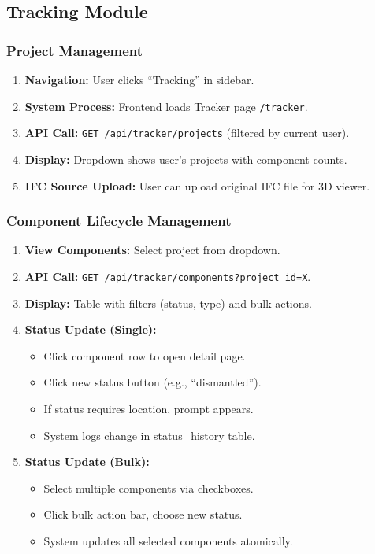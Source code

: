 \documentclass[11pt,a4paper]{article}
\begin{document}
\subsection{Tracking Module}

\subsubsection{Project Management}

\begin{enumerate}[leftmargin=*]
    \item \textbf{Navigation:} User clicks ``Tracking'' in sidebar.
    \item \textbf{System Process:} Frontend loads Tracker page \texttt{/tracker}.
    \item \textbf{API Call:} \texttt{GET /api/tracker/projects} (filtered by current user).
    \item \textbf{Display:} Dropdown shows user's projects with component counts.
    \item \textbf{IFC Source Upload:} User can upload original IFC file for 3D viewer.
\end{enumerate}

\subsubsection{Component Lifecycle Management}

\begin{enumerate}[leftmargin=*]
    \item \textbf{View Components:} Select project from dropdown.
    \item \textbf{API Call:} \texttt{GET /api/tracker/components?project\_id=X}.
    \item \textbf{Display:} Table with filters (status, type) and bulk actions.
    \item \textbf{Status Update (Single):}
        \begin{itemize}
            \item Click component row to open detail page.
            \item Click new status button (e.g., ``dismantled'').
            \item If status requires location, prompt appears.
            \item System logs change in status\_history table.
        \end{itemize}
    \item \textbf{Status Update (Bulk):}
        \begin{itemize}
            \item Select multiple components via checkboxes.
            \item Click bulk action bar, choose new status.
            \item System updates all selected components atomically.
        \end{itemize}
\end{enumerate}
\end{document}
